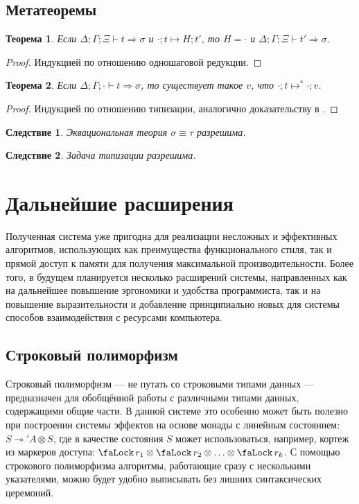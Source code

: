 \documentclass[12pt]{article}
\DeclareMathOperator{\access}{\text{\faLock}}
\newtheorem{theorem}{Теорема}
\newtheorem{corollary}{Следствие}
\begin{document}
\newpage

\subsection{Метатеоремы}

\begin{theorem}
  Если $\Delta;\Gamma;\Xi\vdash t\Rightarrow\sigma$ и $\cdot;t\mapsto H;t'$,
  то $H=\cdot$ и $\Delta;\Gamma;\Xi\vdash t'\Rightarrow\sigma$.
\end{theorem}
\begin{proof}
  Индукцией по отношению одношаговой редукции.
\end{proof}

\begin{theorem}
  Если $\Delta;\Gamma;\cdot\vdash t\Rightarrow\sigma$, то существует такое $v$,
  что $\cdot;t\mapsto^*\cdot;v$.
\end{theorem}
\begin{proof}
  Индукцией по отношению типизации, аналогично доказательству в \cite{clott}.
\end{proof}

\begin{corollary}
  Эквациональная теория $\sigma\equiv\tau$ разрешима.
\end{corollary}

\begin{corollary}
  Задача типизации разрешима.
\end{corollary}

\section{Дальнейшие расширения}

Полученная система уже пригодна для реализации несложных и эффективных
алгоритмов, использующих как преимущества функционального стиля, так и прямой
доступ к памяти для получения максимальной производительности. Более того, в
будущем планируется несколько расширений системы, направленных как на дальнейшее
повышение эргономики и удобства программиста, так и на повышение выразительности
и добавление принципиально новых для системы способов взаимодействия с ресурсами
компьютера.

\subsection{Строковый полиморфизм}

Строковый полиморфизм \cite{row} --- не путать со строковыми типами данных ---
предназначен для обобщённой работы с различными типами данных, содержащими общие
части. В данной системе это особенно может быть полезно при построении системы
эффектов на основе монады с линейным состоянием: $S \multimap' A \otimes S$, где
в качестве состояния $S$ может использоваться, например, кортеж из маркеров
доступа: $\access r_1 \otimes \access r_2 \otimes\ldots\otimes\access r_k$. С
помощью строкового полиморфизма алгоритмы, работающие сразу с несколькими
указателями, можно будет удобно выписывать без лишних синтаксических церемоний.
\end{document}
